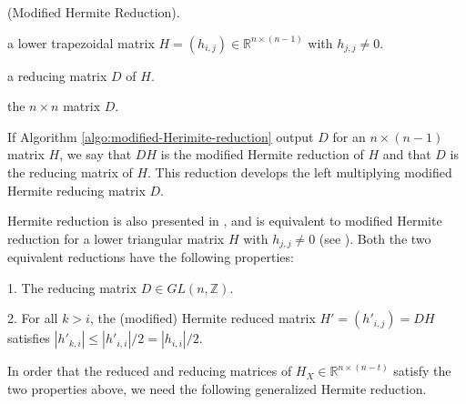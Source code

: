 \documentclass{sig-alternate}
\numberwithin{theorem}{section} \numberwithin{equation}{section}
\begin{document}
\begin{algorithm}[H]
\caption{(Modified Hermite Reduction).}
\begin{algorithmic}[1]
\REQUIRE a lower trapezoidal matrix $H=(h_{i,j})\in
\mathbb{R}^{n\times (n-1)}$ with $h_{j,j} \neq 0$.

\ENSURE a reducing matrix $D$ of $H$.









\RETURN the $n\times n$ matrix $D$.

\end{algorithmic}\label{algo:modified-Herimite-reduction}
\end{algorithm}

If Algorithm \ref{algo:modified-Herimite-reduction} output $D$ for
an $n\times (n-1)$ matrix $H$,  we say that $DH$ is the modified
Hermite reduction of $H$ and that $D$ is the reducing matrix of $H$.
This reduction develops the left multiplying modified Hermite
reducing matrix $D$.


Hermite reduction is also presented in \cite{FBA1999}, and is
equivalent to modified Hermite reduction  for a lower triangular
matrix $H$ with $h_{j,j} \neq 0$ (see \cite[Lemma 3]{FBA1999}). Both
the two equivalent reductions have the following properties:


1. The reducing matrix $D \in GL(n, \mathbb{Z})$.


2. For all $k > i$, the (modified) Hermite reduced matrix $H' =
(h'_{i,j}) = DH$ satisfies $|h'_{k,i}| \leq |h'_{i,i}|/ 2 =
|h_{i,i}|/ 2$.


In order that the reduced and reducing matrices of $H_{X}
\in\mathbb{R}^{n\times(n-t)}$ satisfy the two properties above, we
need the following generalized Hermite reduction. 
\end{document}
